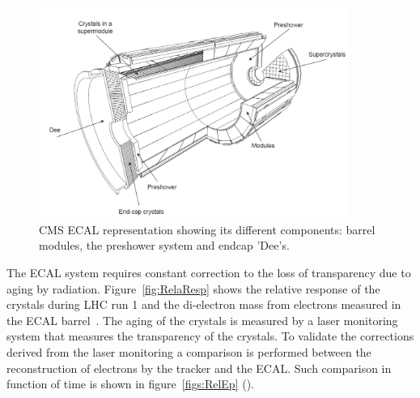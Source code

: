 \begin{figure}[!Hhtbp]
  \begin{center}
    \includegraphics[width=0.9\textwidth]{figs/ECAL.png}
    \caption{CMS ECAL representation showing its different components: barrel modules, the preshower system and endcap 'Dee's.}
    \label{fig:ecal}
  \end{center}
\end{figure}

The ECAL system requires constant correction to the loss of transparency due to aging by radiation. Figure~\ref{fig:RelaResp} shows the relative response of the crystals during LHC run 1 and the di-electron mass from electrons measured in the ECAL barrel~\cite{CMS-DP-2012-015}. The aging of the crystals is measured by a laser monitoring system that measures the transparency of the crystals. To validate the corrections derived from the laser monitoring a comparison is performed between the reconstruction of electrons by the tracker and the ECAL. Such comparison in function of time is shown in figure~\ref{figs:RelEp} (\cite{CMS-DP-2012-015}).

